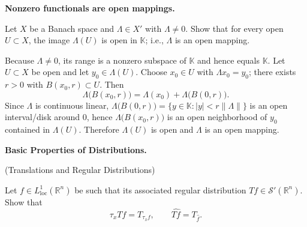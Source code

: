 \begin{problem}[CP-II-0125]
\label{prob:cp-ii-0125}
\textbf{Nonzero functionals are open mappings.}

\hspace*{1.5em}Let $X$ be a Banach space and $\Lambda\in X'$ with $\Lambda\neq 0$.
	Show that for every open $U\subset X$, the image $\Lambda(U)$ is open in $\mathbb K$; i.e., $\Lambda$ is an open mapping.
\end{problem}

\begin{solution}
Because $\Lambda\neq 0$, its range is a nonzero subspace of $\mathbb K$ and hence equals $\mathbb K$.
	Let $U\subset X$ be open and let $y_0\in \Lambda(U)$.
	Choose $x_0\in U$ with $\Lambda x_0=y_0$; there exists $r>0$ with $B(x_0,r)\subset U$.
	Then
	\[
	\Lambda\big(B(x_0,r)\big)=\Lambda(x_0)+\Lambda\big(B(0,r)\big).
	\]
	Since $\Lambda$ is continuous linear, $\Lambda\big(B(0,r)\big)=\{y\in\mathbb K:|y|< r\|\Lambda\|\}$ is an open interval/disk around $0$,
	hence $\Lambda\big(B(x_0,r)\big)$ is an open neighborhood of $y_0$ contained in $\Lambda(U)$.
	Therefore $\Lambda(U)$ is open and $\Lambda$ is an open mapping.
\end{solution}

\begin{problem}[CP-II-0126]
\label{prob:cp-ii-0126}
\textbf{Basic Properties of Distributions.}

\hspace*{1.5em}(Translations and Regular Distributions)

Let $f\in L^{1}_{\mathrm{loc}}(\mathbb{R}^n)$ be such that its associated
regular distribution $Tf\in\mathcal{S}'(\mathbb{R}^n)$.  Show that
\[
\tau_x Tf = T_{\tau_x f},
\qquad
\widehat{Tf} = T_{\widehat{f}}.
\]
\end{problem}

